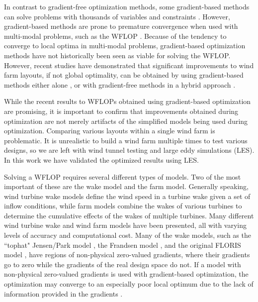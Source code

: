 \documentclass[conf]{new-aiaa}
\begin{document}
In contrast to gradient-free optimization methods, some gradient-based methods can solve problems with thousands of variables and constraints \cite{gill2005}. However, gradient-based methods are prone to premature convergence when used with multi-modal problems, such as the WFLOP \cite{acero2014}. Because of the tendency to converge to local optima in multi-modal problems, gradient-based optimization methods have not historically been seen as viable for solving the WFLOP. However, recent studies have demonstrated that significant improvements to wind farm layouts, if not global optimality, can be obtained by using gradient-based methods either alone \cite{fleming2015, guirguis2016, gebraad2017-max-aep, thomas2017, thomas2018-wec},  or with gradient-free methods in a hybrid approach \cite{rethore2014}. 

While the recent results to WFLOPs obtained using gradient-based optimization are promising, it is important to confirm that improvements obtained during optimization are not merely artifacts of the simplified models being used during optimization. Comparing various layouts within a single wind farm is problematic. It is unrealistic to build a wind farm multiple times to test various designs, so we are left with wind tunnel testing and large eddy simulations (LES). In this work we have validated the optimized results using LES.

Solving a WFLOP requires several different types of models. Two of the most important of these are the wake model and the farm model. Generally speaking, wind turbine wake models define the wind speed in a turbine wake given a set of inflow conditions, while farm models combine the wakes of various turbines to determine the cumulative effects of the wakes of multiple turbines. Many different wind turbine wake and wind farm models have been presented, all with varying levels of accuracy and computational cost. Many of the wake models, such as the ``tophat" Jensen/Park model \cite{jensen1983}, the Frandsen model \cite{frandsen2006}, and the original FLORIS model \cite{gebraad2014}, have regions of non-physical zero-valued gradients, where their gradients go to zero while the gradients of the real design space do not. If a model with non-physical zero-valued gradients is used with gradient-based optimization, the optimization may converge to an especially poor local optimum due to the lack of information provided in the gradients \cite{thomas2017}.
\end{document}
